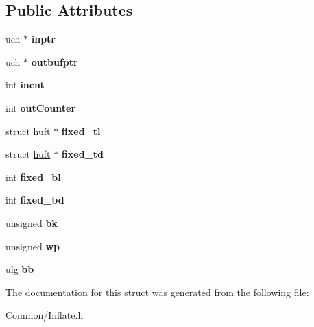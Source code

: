 \subsection*{Public Attributes}
\begin{DoxyCompactItemize}
\item 
\mbox{\label{struct_g__struct_a83f0d6734daf23a833aa74a6d380c70e}} 
uch $\ast$ {\bfseries inptr}
\item 
\mbox{\label{struct_g__struct_a8773018ce61642ca950da49bb220f935}} 
uch $\ast$ {\bfseries outbufptr}
\item 
\mbox{\label{struct_g__struct_aa90099321aad1a41fd86b89422fe8c7d}} 
int {\bfseries incnt}
\item 
\mbox{\label{struct_g__struct_a5bd8d23bd5f3216eb8105e4ad859e56c}} 
int {\bfseries out\+Counter}
\item 
\mbox{\label{struct_g__struct_a7864342dfc4eb2ff04ab4a8c35eeda12}} 
struct \hyperlink{structhuft}{huft} $\ast$ {\bfseries fixed\+\_\+tl}
\item 
\mbox{\label{struct_g__struct_ad8a06bf19780575fd120ab2677a4b08f}} 
struct \hyperlink{structhuft}{huft} $\ast$ {\bfseries fixed\+\_\+td}
\item 
\mbox{\label{struct_g__struct_a446d238b43095961eed9c7ba6592a7b1}} 
int {\bfseries fixed\+\_\+bl}
\item 
\mbox{\label{struct_g__struct_af6b8926eb78d6478712350c6b6c0fc30}} 
int {\bfseries fixed\+\_\+bd}
\item 
\mbox{\label{struct_g__struct_a646a569ce1345916aa9ff6fb6fc2c7ea}} 
unsigned {\bfseries bk}
\item 
\mbox{\label{struct_g__struct_ab704a322a84c2abb0b190a4f822a83d6}} 
unsigned {\bfseries wp}
\item 
\mbox{\label{struct_g__struct_afb6f851ac38dae5c9b0b0bca0be8899e}} 
ulg {\bfseries bb}
\end{DoxyCompactItemize}


The documentation for this struct was generated from the following file\+:\begin{DoxyCompactItemize}
\item 
Common/Inflate.\+h\end{DoxyCompactItemize}
